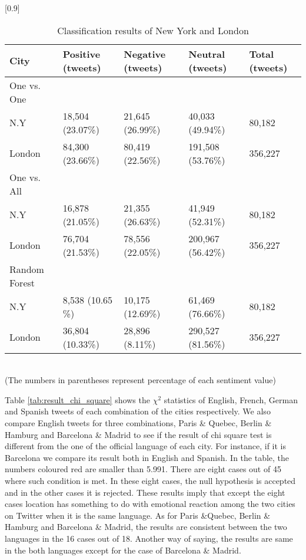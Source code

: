 \documentclass[twocolumn]{article}
\begin{document}
\begin{table}[ht]
	\caption{Classification results of New York and London}
	\scalebox{0.8}[0.9]{
	\begin{tabular}{|l|p{1.5cm}|p{1.5cm}|p{1.5cm}|p{1.5cm}|} \hline
	City&Positive (tweets)&Negative (tweets)&Neutral (tweets)&Total (tweets)\\ \hline
	One vs. One& {} & {} & {} & {}\\ \hline
	N.Y  & 18,504 (23.07\%) & 21,645 (26.99\%)  & 40,033 (49.94\%) & 80,182\\
	London & 84,300 (23.66\%)& 80,419 (22.56\%)& 191,508 (53.76\%)& 356,227\\ \hline
	One vs. All& {} & {} & {} & {}\\ \hline
	N.Y  & 16,878 (21.05\%)& 21,355 (26.63\%)& 41,949 (52.31\%)& 80,182\\
	London & 76,704 (21.53\%)& 78,556 (22.05\%)& 200,967 (56.42\%)& 356,227\\ \hline
	Random Forest& {} & {} & {} & {}\\ \hline
	N.Y  & 8,538 (10.65 \%)& 10,175 (12.69\%)& 61,469 (76.66\%)& 80,182\\ 
	London & 36,804 (10.33\%)& 28,896 (8.11\%)& 290,527 (81.56\%)& 356,227\\ \hline

	\end{tabular}
	}
	\label{tab:result_ny_london}
	\\(The numbers in parentheses represent percentage of each sentiment value)
\end{table}

Table \ref{tab:result_chi_square} shows the $\chi^2$ statistics of English, French, German and Spanish tweets of each combination of the cities respectively.
We also compare English tweets for three combinations, Paris \& Quebec, Berlin \& Hamburg and Barcelona \& Madrid to see if the result of chi square test is different from the one of the official language of each city.
For instance, if it is Barcelona we compare its result both in English and Spanish.
In the table, the numbers coloured red are smaller than 5.991.
There are eight cases out of 45 where such condition is met.
In these eight cases, the null hypothesis is accepted and in the other cases it is rejected.
These results imply that except the eight cases location has something to do with emotional reaction among the two cities on Twitter when it is the same language. 
As for Paris \&Quebec, Berlin \& Hamburg and Barcelona \& Madrid, the results are consistent between the two languages in the 16 cases out of 18.
Another way of saying, the results are same in the both languages except for the case of Barcelona \& Madrid.
\end{document}
